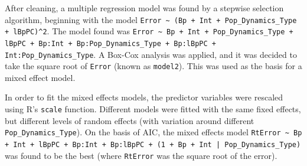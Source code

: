 \documentclass[11pt,a4paper]{article}
\begin{document}
After cleaning, a multiple regression model was found by a stepwise selection algorithm, beginning with the model \verb|Error ~ (Bp + Int + Pop_Dynamics_Type + lBpPC)^2|. The model found was \verb|Error ~ Bp + Int + Pop_Dynamics_Type + lBpPC + Bp:Int + Bp:Pop_Dynamics_Type + Bp:lBpPC + Int:Pop_Dynamics_Type|. A Box-Cox analysis was applied, and it was decided to take the square root of \verb|Error| (known as \verb|model2|). This was used as the basis for a mixed effect model.

In order to fit the mixed effects models, the predictor variables were rescaled using R's \verb|scale| function. Different models were fitted with the same fixed effects, but different levels of random effects (with variation around different \verb|Pop_Dynamics_Type|). On the basis of AIC, the mixed effects model \verb;RtError ~ Bp + Int + lBpPC + Bp:Int + Bp:lBpPC + (1 + Bp + Int | Pop_Dynamics_Type); was found to be the best (where \verb|RtError| was the square root of the error).
\end{document}
